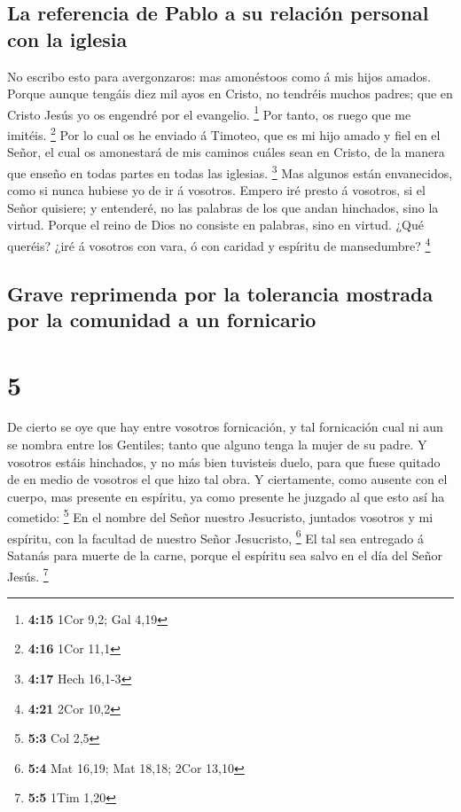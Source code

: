 \hypertarget{la-referencia-de-pablo-a-su-relaciuxf3n-personal-con-la-iglesia}{%
\subsection{La referencia de Pablo a su relación personal con la
iglesia}\label{la-referencia-de-pablo-a-su-relaciuxf3n-personal-con-la-iglesia}}

 No escribo esto para avergonzaros: mas amonéstoos como á
mis hijos amados.  Porque aunque tengáis diez mil ayos en
Cristo, no tendréis muchos padres; que en Cristo Jesús yo os engendré
por el evangelio. \footnote{\textbf{4:15} 1Cor 9,2; Gal 4,19}
 Por tanto, os ruego que me imitéis. \footnote{\textbf{4:16}
  1Cor 11,1}  Por lo cual os he enviado á Timoteo, que es
mi hijo amado y fiel en el Señor, el cual os amonestará de mis caminos
cuáles sean en Cristo, de la manera que enseño en todas partes en todas
las iglesias. \footnote{\textbf{4:17} Hech 16,1-3}  Mas
algunos están envanecidos, como si nunca hubiese yo de ir á vosotros.
 Empero iré presto á vosotros, si el Señor quisiere; y
entenderé, no las palabras de los que andan hinchados, sino la virtud.
 Porque el reino de Dios no consiste en palabras, sino en
virtud.  ¿Qué queréis? ¿iré á vosotros con vara, ó con
caridad y espíritu de mansedumbre? \footnote{\textbf{4:21} 2Cor 10,2}

\hypertarget{grave-reprimenda-por-la-tolerancia-mostrada-por-la-comunidad-a-un-fornicario}{%
\subsection{Grave reprimenda por la tolerancia mostrada por la comunidad
a un
fornicario}\label{grave-reprimenda-por-la-tolerancia-mostrada-por-la-comunidad-a-un-fornicario}}

\hypertarget{section-4}{%
\section{5}\label{section-4}}

 De cierto se oye que hay entre vosotros fornicación, y
tal fornicación cual ni aun se nombra entre los Gentiles; tanto que
alguno tenga la mujer de su padre.  Y vosotros estáis
hinchados, y no más bien tuvisteis duelo, para que fuese quitado de en
medio de vosotros el que hizo tal obra.  Y ciertamente,
como ausente con el cuerpo, mas presente en espíritu, ya como presente
he juzgado al que esto así ha cometido: \footnote{\textbf{5:3} Col 2,5}
 En el nombre del Señor nuestro Jesucristo, juntados
vosotros y mi espíritu, con la facultad de nuestro Señor Jesucristo,
\footnote{\textbf{5:4} Mat 16,19; Mat 18,18; 2Cor 13,10} 
El tal sea entregado á Satanás para muerte de la carne, porque el
espíritu sea salvo en el día del Señor Jesús. \footnote{\textbf{5:5}
  1Tim 1,20}

